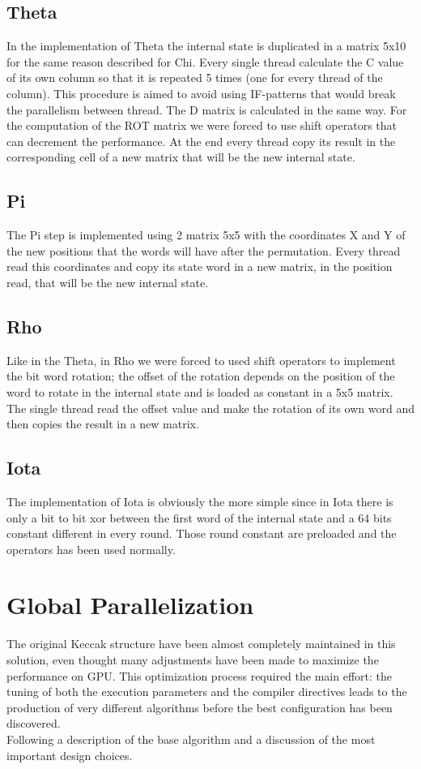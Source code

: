 \subsection{Theta}
In the implementation of Theta the internal state is duplicated in a matrix 5x10 for the same reason described for Chi. Every single thread calculate the C value of its own column so that it is repeated 5 times (one for every thread of the column). This procedure is aimed to avoid using IF-patterns that would break the parallelism between thread. The D matrix is calculated in the same way. For the computation of the ROT matrix we were forced to use shift operators that can decrement the performance. At the end every thread copy its result in the corresponding cell of a new matrix that will be the new internal state.

\subsection{Pi}
The Pi step is implemented using 2 matrix 5x5 with the coordinates X and Y of the new positions that the words will have after the permutation. Every thread read this coordinates and copy its state word in a new matrix, in the position read, that will be the new internal state.

\subsection{Rho}
Like in the Theta, in Rho we were forced to used shift operators to implement the bit word rotation; the offset of the rotation depends on the position of the word to rotate in the internal state and is loaded as constant in a 5x5 matrix. The single thread read the offset value and make the rotation of its own word and then copies the result in a new matrix.

\subsection{Iota}
The implementation of Iota is obviously the more simple since in Iota there is only a bit to bit xor between the first word of the internal state and a 64 bits constant different in every round. Those round constant are preloaded and the operators has been used normally.


\section{Global Parallelization}
The original Keccak structure have been almost completely maintained in this solution, even thought many adjustments have been made to maximize the performance on GPU. This optimization process required the main effort: the tuning of both the execution parameters and the compiler directives leads to the production of very different algorithms before the best configuration has been discovered.\\
Following a description of the base algorithm and a discussion of the most important design choices.\\

